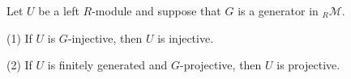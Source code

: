 Let $U$ be a left $R$-module and suppose that $G$ is a generator in ${}_R\mathcal{M}$.

(1) If $U$ is $G$-injective, then $U$ is injective.

(2) If $U$ is finitely generated and $G$-projective, then $U$ is projective.

